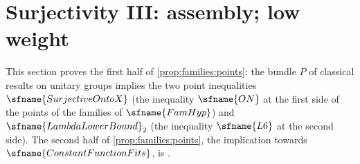 \section{Surjectivity III: assembly; low weight}\label{sec:pf:onto3}

\providecommand{\ontothreeidx}{\operatorname{idx}}
\providecommand{\ontothreeTw}{\mathrm{Tw}}
\providecommand{\ontothreeON}{\sfname{ON}}
\providecommand{\ontothreeONw}{\sfname{ON}_{\ast}}
\providecommand{\ontothreeLsix}{\sfname{L6}}
\providecommand{\ontothreeClosed}{\sfname{Closed}}
\providecommand{\ontothreeEv}{\mathrm{Ev}}
\providecommand{\ontothreeMore}{\mathrm{Aux}}
\providecommand{\ontothreePC}{\mathrm{PC}}
\providecommand{\ontothreeAdel}{\mathcal{A}}
\providecommand{\ontothreeSt}[1]{\mathcal{S}_{\mathrm{#1}}}
\providecommand{\ontothreeerr}{\mathrm{err}}
\providecommand{\ontothreeerrOn}{\mathrm{err}_{\mathrm{On}}}
\providecommand{\ontothreeerrl}{\mathrm{err}_{\mathrm{l}}}
\providecommand{\ontothreeerrP}{\mathrm{err}_{\mathrm{P}}}
\providecommand{\ontothreeerrG}{\mathrm{err}_{\mathrm{G}}}
\providecommand{\ontothreeDF}{\operatorname{DF}}
\providecommand{\ontothreesize}{\operatorname{size}}
\providecommand{\ontothreePP}{\mathsf{P}}
\providecommand{\ontothreeRR}{\mathsf{R}}

This section proves the first half of \cref{prop:families:points}: the bundle $P$ of classical results on
unitary groups implies the two point inequalities $\sfname{SurjectiveOntoX}$ (the inequality $\sfname{ON}$ at the
first side of the points of the families of $\sfname{FamHyp}$) and $\sfname{LambdaLowerBound}_2$ (the inequality
$\sfname{L6}$ at the second side). The second half of \cref{prop:families:points}, the implication towards
$\sfname{ConstantFunctionFits}$, is
.

